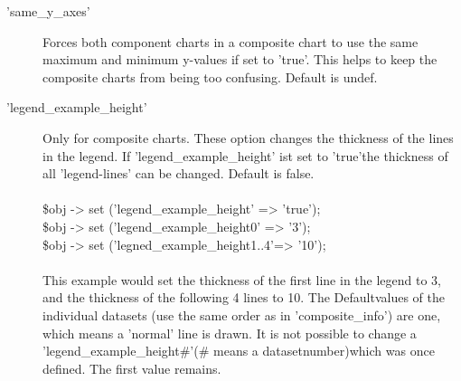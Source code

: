 \begin{description}
\item['same\_y\_axes'] Forces both component charts in a composite chart 
     to use the same maximum and minimum y-values if set to 'true'. 
     This helps to keep the composite charts from being too confusing. Default is undef.
     
\item['legend\_example\_height'] Only for composite charts. These option changes the thickness
     of the lines in the legend. If 'legend\_example\_height' ist set to 'true'the 
     thickness of all 'legend-lines' can be changed. Default is false.\\
     \\
     \$obj -> set ('legend\_example\_height'    => 'true');\\
     \$obj -> set ('legend\_example\_height0'   => '3');\\
     \$obj -> set ('legned\_example\_height1..4'=> '10');\\
     \\
     This example would set the thickness of the first line in the legend to 3, and the 
     thickness of the following 4 lines to 10. The Defaultvalues of the individual datasets
     (use the same order as in 'composite\_info') are one, which means a 'normal' line
     is drawn. It is not possible to change a 'legend\_example\_height\#'(\# means a                 datasetnumber)which was once defined. The first value remains.            
                      
\end{description}
